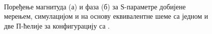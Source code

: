 \begin{figure}[!t]
\centering
{}\\
\caption{Поређење магнитуда (а) и фаза (б) за $Ѕ$-параметре добијене мерењем, симулацијом и на основу еквивалентне шеме са једном и две П-ћелије за конфигурацију са .} 
\label{f11}
\end{figure}

